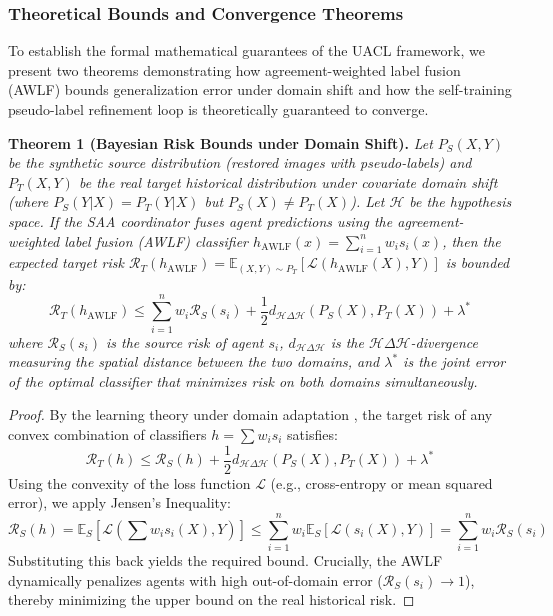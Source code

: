 \documentclass[12pt,onecolumn,a4paper]{IEEEtran}
\begin{document}
\subsubsection{Theoretical Bounds and Convergence Theorems}
To establish the formal mathematical guarantees of the UACL framework, we present two theorems demonstrating how agreement-weighted label fusion (AWLF) bounds generalization error under domain shift and how the self-training pseudo-label refinement loop is theoretically guaranteed to converge.

\textbf{Theorem 1 (Bayesian Risk Bounds under Domain Shift).}\quad
\textit{Let $P_S(X, Y)$ be the synthetic source distribution (restored images with pseudo-labels) and $P_T(X, Y)$ be the real target historical distribution under covariate domain shift (where $P_S(Y|X) = P_T(Y|X)$ but $P_S(X) \neq P_T(X)$). Let $\mathcal{H}$ be the hypothesis space. If the SAA coordinator fuses agent predictions using the agreement-weighted label fusion (AWLF) classifier $h_{\text{AWLF}}(x) = \sum_{i=1}^n w_i s_i(x)$, then the expected target risk $\mathcal{R}_T(h_{\text{AWLF}}) = \mathbb{E}_{(X,Y)\sim P_T}[\mathcal{L}(h_{\text{AWLF}}(X), Y)]$ is bounded by:}
\begin{equation}
  \mathcal{R}_T(h_{\text{AWLF}}) \le \sum_{i=1}^n w_i \mathcal{R}_S(s_i) + \frac{1}{2} d_{\mathcal{H}\Delta\mathcal{H}}(P_S(X), P_T(X)) + \lambda^*
\end{equation}
\textit{where $\mathcal{R}_S(s_i)$ is the source risk of agent $s_i$, $d_{\mathcal{H}\Delta\mathcal{H}}$ is the $\mathcal{H}\Delta\mathcal{H}$-divergence measuring the spatial distance between the two domains, and $\lambda^*$ is the joint error of the optimal classifier that minimizes risk on both domains simultaneously.}

\begin{proof}
By the learning theory under domain adaptation \cite{ben2010theory}, the target risk of any convex combination of classifiers $h = \sum w_i s_i$ satisfies:
\begin{equation}
  \mathcal{R}_T(h) \le \mathcal{R}_S(h) + \frac{1}{2} d_{\mathcal{H}\Delta\mathcal{H}}(P_S(X), P_T(X)) + \lambda^*
\end{equation}
Using the convexity of the loss function $\mathcal{L}$ (e.g., cross-entropy or mean squared error), we apply Jensen's Inequality:
\begin{equation}
  \mathcal{R}_S(h) = \mathbb{E}_S[\mathcal{L}(\sum w_i s_i(X), Y)] \le \sum_{i=1}^n w_i \mathbb{E}_S[\mathcal{L}(s_i(X), Y)] = \sum_{i=1}^n w_i \mathcal{R}_S(s_i)
\end{equation}
Substituting this back yields the required bound. Crucially, the AWLF dynamically penalizes agents with high out-of-domain error ($\mathcal{R}_S(s_i) \to 1$), thereby minimizing the upper bound on the real historical risk.
\end{proof}
\end{document}
